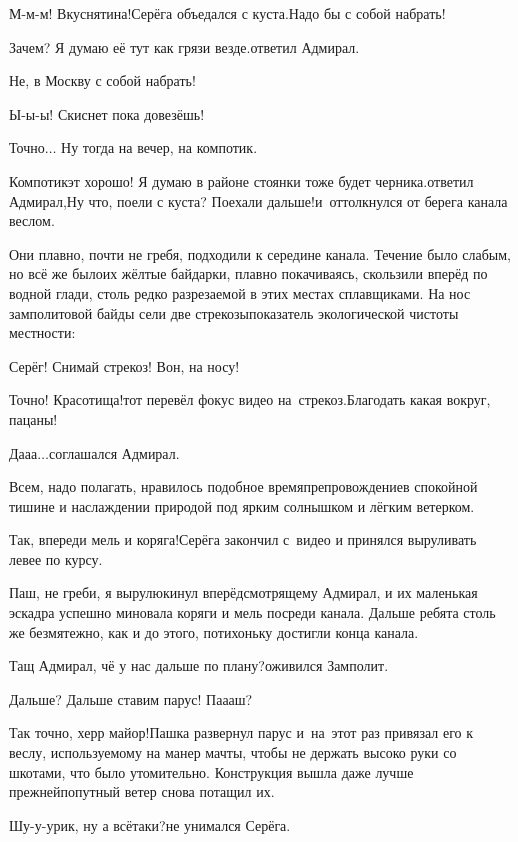 \diagdash М-м-м! Вкуснятина!\mdash Серёга объедался с куста.\mdash Надо бы с собой набрать!

\diagdash Зачем? Я думаю её тут как грязи везде.\mdash ответил Адмирал.

\diagdash Не, в Москву с собой набрать!

\diagdash Ы-ы-ы! Скиснет пока довезёшь!

\diagdash Точно$\ldots$ Ну тогда на вечер, на компотик.

\diagdash Компотик\mdash эт хорошо! Я думаю в районе стоянки тоже будет черника.\mdash ответил Адмирал,\mdash Ну что, поели с куста? Поехали дальше!\mdash и~оттолкнулся от берега канала веслом.

Они плавно, почти не гребя, подходили к середине канала. Течение было слабым, но всё же было\mdash их жёлтые байдарки, плавно покачиваясь, скользили вперёд по водной глади, столь редко разрезаемой в этих местах сплавщиками. На нос замполитовой байды сели две стрекозы\mdash показатель экологической чистоты местности:

\diagdash Серёг! Снимай стрекоз! Вон, на носу!

\diagdash Точно! Красотища!\mdash тот перевёл фокус видео на~стрекоз.\mdash Благодать какая вокруг, пацаны!

\diagdash Да\sdash а\sdash а$\ldots$\mdash соглашался Адмирал.

Всем, надо полагать, нравилось подобное времяпрепровождение\mdash в спокойной тишине и наслаждении природой под ярким солнышком и лёгким ветерком. 

\diagdash Так, впереди мель и коряга!\mdash Серёга закончил с~видео и принялся выруливать левее по курсу. 

\diagdash Паш, не греби, я вырулю\mdash кинул вперёдсмотрящему Адмирал, и их маленькая эскадра успешно миновала коряги и мель посреди канала. Дальше ребята столь же безмятежно, как и до этого, потихоньку достигли конца канала.

\diagdash Тащ Адмирал, чё у нас дальше по плану?\mdash оживился Замполит.

\diagdash Дальше? Дальше ставим парус! Па\sdash а\sdash аш?

\diagdash Так точно, херр майор!\mdash Пашка развернул парус и~на~этот раз привязал его к веслу, используемому на манер мачты, чтобы не держать высоко руки со шкотами, что было утомительно. Конструкция вышла даже лучше прежней\mdash попутный ветер снова потащил их. 

\diagdash Шу-у-урик, ну а всё\sdash таки?\mdash не унимался Серёга.

